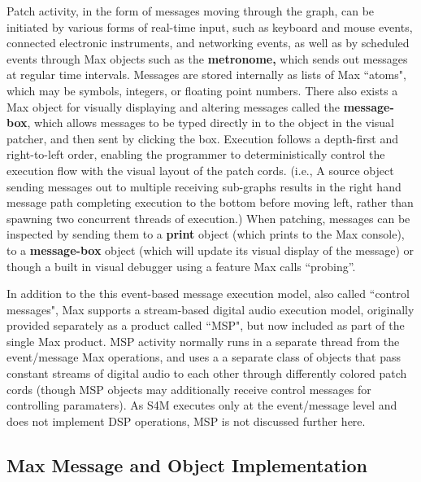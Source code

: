 \documentclass[acmsmall]{acmart}
\begin{document}
Patch activity, in the form of messages moving through the graph, can be initiated by 
various forms of real-time input, such as keyboard and mouse events, connected electronic instruments, and networking 
events, as well as by scheduled events through Max objects such as the \textbf{metronome,} which sends
out messages at regular time intervals. Messages are 
stored internally as lists of Max ``atoms", which may be symbols, integers, or floating point numbers. 
\cite{Puckette2002}
There also exists a Max object for visually displaying and altering messages called the \textbf{message-box},
which allows messages to be typed directly in to the object in the visual patcher, and then sent by clicking the box.  
Execution follows a depth-first and right-to-left order, enabling the programmer to deterministically 
control the execution flow with the visual layout of the patch cords. (i.e., A source object sending 
messages out to multiple receiving sub-graphs results in the right hand message path completing 
execution to the bottom before moving left, rather than spawning two concurrent threads of execution.) When 
patching, messages can be inspected by sending them to a \textbf{print} object (which prints to the Max console),
to a \textbf{message-box} object (which will update its visual display of the message) 
or though a built in visual debugger using a feature Max calls ``probing”.

In addition to the this event-based message execution model, also called ``control messages", Max 
supports a stream-based digital 
audio execution model, originally provided separately as a product called ``MSP", but now included 
as part of the single Max product.
MSP activity normally runs in a separate thread from the event/message Max operations, and uses a  
a separate class of objects that pass constant streams of digital audio to each other through differently 
colored patch cords (though MSP objects may additionally receive control messages for controlling paramaters). As  
S4M executes only at the event/message level and does not implement DSP operations, MSP is not 
discussed further here. 



\subsection{Max Message and Object Implementation} 
\end{document}
